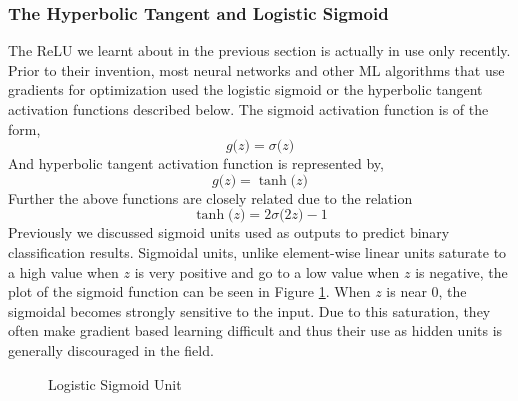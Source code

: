 \documentclass[14pt]{extarticle}
\numberwithin{equation}{section}
\begin{document}
	\subsubsection{The Hyperbolic Tangent and Logistic Sigmoid}
	The ReLU we learnt about in the previous section is actually in use only recently. Prior to their invention, most neural networks and other ML algorithms that use gradients for optimization used the logistic sigmoid or the hyperbolic tangent activation functions described below.
	The sigmoid activation function is of the form,
	\begin{equation}
	g\big(z\big) = \sigma\big(z\big)
	\end{equation}
	And hyperbolic tangent activation function is represented by,
	\begin{equation}
	g\big(z\big) = \tanh\big(z\big)
	\end{equation}
	Further the above functions are closely related due to the relation $$\tanh\big(z\big) = 2\sigma\big(2z\big) - 1$$
	Previously we discussed sigmoid units used as outputs to predict binary classification results. Sigmoidal units, unlike element-wise linear units saturate to a high value when $z$ is very positive and go to a low value when $z$ is negative, the plot of the sigmoid function can be seen in Figure \ref{sigmoid}. When $z$ is near 0, the sigmoidal becomes strongly sensitive to the input. Due to this saturation, they often make gradient based learning difficult and thus their use as hidden units is generally discouraged in the field.
	\begin{figure}[H]
		\centering
		\setlength{\fboxsep}{5pt}%
		\setlength{\fboxrule}{1pt}%
		\caption{Logistic Sigmoid Unit
			\label{sigmoid}}
	\end{figure}
\end{document}
